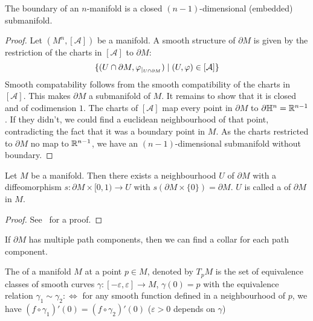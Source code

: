 \documentclass[a4paper,11pt]{article}
\begin{document}
\begin{theorem}\label{boundary manifold}
    The boundary of an \(n\)-manifold is a closed \((n-1)\)-dimensional (embedded) submanifold.
\end{theorem}

\begin{proof}
    Let \((M^n,[\mathcal{A}])\) be a manifold. A smooth structure of \(\partial M\) is given by the restriction of the charts in \([\mathcal{A}]\) to \(\partial M\): \[\{(U\cap\partial M,\varphi_{|_{U\cap\partial M}})\mid (U,\varphi)\in[\mathcal{A}]\}\]
    Smooth compatability follows from the smooth compatibility of the charts in \([\mathcal{A}]\). This makes \(\partial M\) a submanifold of \(M\). It remains to show that it is closed and of codimension \(1\). The charts of \([\mathcal{A}]\) map every point in \(\partial M\) to \(\partial\mathbb{H}^n=\mathbb{R}^{n-1}\). If they didn't, we could find a euclidean neighbourhood of that point, contradicting the fact that it was a boundary point in \(M\). As the charts restricted to \(\partial M\) no map to \(\mathbb{R}^{n-1}\), we have an \((n-1)\)-dimensional submanifold without boundary.
\end{proof}

\begin{theorem}\label{collar}
    Let \(M\) be a manifold. Then there exists a neighbourhood \(U\) of \(\partial M\) with a diffeomorphism \(s:\partial M\times [0,1)\to U\) with \(s(\partial M\times\{0\})=\partial M\). \(U\) is called a  of \(\partial M\) in \(M\).
\end{theorem}

\begin{proof}See\ \cite[p.223]{lee} for a proof.
\end{proof}

\begin{observation}
    If \(\partial M\) has multiple path components, then we can find a collar for each path component.
\end{observation}

\begin{definition}
    The  of a manifold \(M\) at a point \(p\in M\), denoted by \(T_pM\) is the set of equivalence classes of smooth curves \(\gamma:[-\varepsilon,\varepsilon]\to M\), \(\gamma(0)=p\) with the equivalence relation \(\gamma_1\sim\gamma_2:\Leftrightarrow\) for any smooth function defined in a neighbourhood of \(p\), we have \((f\circ\gamma_1)'(0)=(f\circ\gamma_2)'(0)\) (\(\varepsilon>0\) depends on \(\gamma\))
\end{definition}
\end{document}
